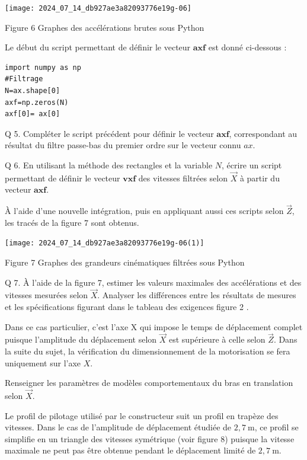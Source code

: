 \documentclass[10pt]{article}
\begin{document}
\begin{center}
\texttt{[image: 2024\_07\_14\_db927ae3a82093776e19g-06]}
\end{center}

Figure 6 Graphes des accélérations brutes sous Python

Le début du script permettant de définir le vecteur $\boldsymbol{a x f}$ est donné ci-dessous :

\begin{verbatim}
import numpy as np
#Filtrage
N=ax.shape[0]
axf=np.zeros(N)
axf[0]= ax[0]
\end{verbatim}

Q 5. Compléter le script précédent pour définir le vecteur $\boldsymbol{a x f}$, correspondant au résultat du filtre passe-bas du premier ordre sur le vecteur connu $a x$.

Q 6. En utilisant la méthode des rectangles et la variable $N$, écrire un script permettant de définir le vecteur $\boldsymbol{v} \boldsymbol{x} \boldsymbol{f}$ des vitesses filtrées selon $\vec{X}$ à partir du vecteur $\boldsymbol{a} \boldsymbol{x} \boldsymbol{f}$.

À l'aide d'une nouvelle intégration, puis en appliquant aussi ces scripts selon $\vec{Z}$, les tracés de la figure 7 sont obtenus.

\begin{center}
\texttt{[image: 2024\_07\_14\_db927ae3a82093776e19g-06(1)]}
\end{center}

Figure 7 Graphes des grandeurs cinématiques filtrées sous Python

Q 7. À l'aide de la figure 7, estimer les valeurs maximales des accélérations et des vitesses mesurées selon $\vec{X}$. Analyser les différences entre les résultats de mesures et les spécifications figurant dans le tableau des exigences figure 2 .

Dans ce cas particulier, c'est l'axe X qui impose le temps de déplacement complet puisque l'amplitude du déplacement selon $\vec{X}$ est supérieure à celle selon $\vec{Z}$. Dans la suite du sujet, la vérification du dimensionnement de la motorisation se fera uniquement sur l'axe $X$.

Renseigner les paramètres de modèles comportementaux du bras en translation selon $\vec{X}$.

Le profil de pilotage utilisé par le constructeur suit un profil en trapèze des vitesses. Dans le cas de l'amplitude de déplacement étudiée de $2,7 \mathrm{~m}$, ce profil se simplifie en un triangle des vitesses symétrique (voir figure 8) puisque la vitesse maximale ne peut pas être obtenue pendant le déplacement limité de $2,7 \mathrm{~m}$.
\end{document}
